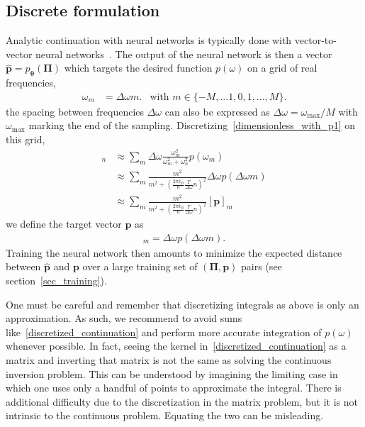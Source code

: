 \documentclass[notitlepage,11pt,nofootinbib]{revtex4-1}
\renewcommand{\vec}[1]{\bm{#1}}
\begin{document}
\subsection{Discrete formulation}
\label{section_discrete}

Analytic continuation with neural networks is typically done with vector-to-vector neural networks~\cite{Fournier2020,Xie2019,Yoon2018,Kades2019}. The output of the neural network is then a vector $\hat{\vec p} = p_{\vec \theta}(\vec \Pi)$ which targets the desired function $p(\omega)$ on a grid of real frequencies,
\begin{align}
\omega_m &=
\Delta\omega m.
&\text{with }m\in\{-M,...1,0,1,...,M\}.
\label{eq_discrete_grid}
\end{align}
the spacing between frequencies $\Delta \omega$ can also be expressed as $\Delta\omega =\omega_{\text{max}}/M$ with $\omega_{\text{max}}$ marking the end of the sampling. Discretizing~\eqref{dimensionless_with_p1} on this grid,\begin{align}
[\vec \Pi]_n
&\approx
\sum_{m}
\Delta\omega \frac{\omega_m^2}{\omega_m^2+\omega_n^2} p(\omega_m)
\label{discretized_continuation_1}
\\
&\approx
\sum_{m}
\frac{m^2}{m^2+(\frac{2\pi k_B}{\hbar}\frac{T}{\Delta\omega}n)^2} \Delta\omega p(\Delta\omega m)
\\
&\approx
\sum_{m}
\frac{m^2}{m^2+(\frac{2\pi k_B}{\hbar}\frac{T}{\Delta\omega}n)^2} 
[\vec p]_m
\label{discretized_continuation}
\end{align}
we define the target vector $\vec p$ as
\begin{align}
    [\vec p]_m = \Delta\omega p(\Delta\omega m).
\end{align}
Training the neural network then amounts to minimize the expected distance between $\hat{\vec p}$ and $\vec p$ over a large training set of $(\vec \Pi,\vec p)$ pairs (see section~\ref{sec_training}).

One must be careful and remember that discretizing integrals as above is only an approximation. 
As such, we recommend to avoid sums like~\eqref{discretized_continuation} and perform more accurate integration of $p(\omega)$ whenever possible.
In fact, seeing the kernel in~\eqref{discretized_continuation} as a matrix and inverting that matrix is not the same as solving the continuous inversion problem. This can be understood by imagining the limiting case in which one uses only a handful of points to approximate the integral. There is additional difficulty due to the discretization in the matrix problem, but it is not intrinsic to the continuous problem. Equating the two can be misleading.
\end{document}
